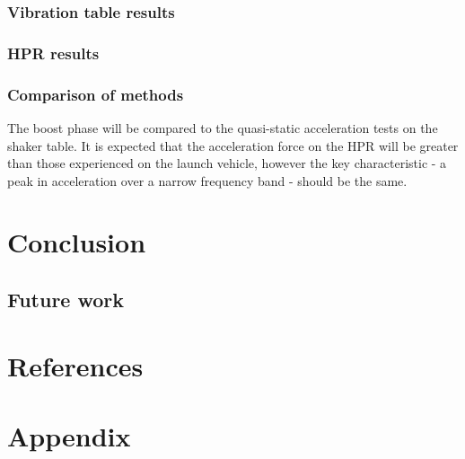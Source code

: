 \documentclass[a4paper,11pt]{article}
\begin{document}
\subsubsection{Vibration table results}
\subsubsection{HPR results}
\subsubsection{Comparison of methods}
The boost phase will be compared to the quasi-static acceleration tests on the shaker table. It is expected that the acceleration force on the HPR will be greater than those experienced on the launch vehicle, however the key characteristic - a peak in acceleration over a narrow frequency band - should be the same.

\section{Conclusion}
\subsection{Future work}

\section{References}

\printbibliography[heading=none]

\section{Appendix}
\end{document}
